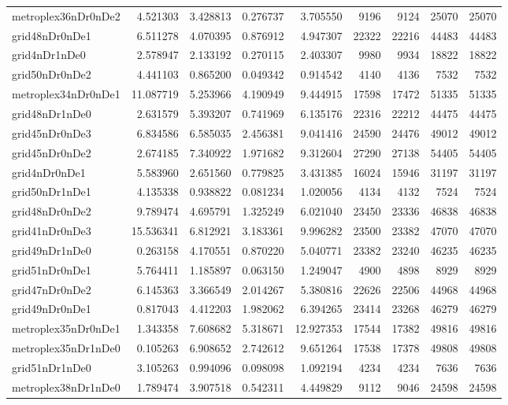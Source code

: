 \begin{longtable}{|l|r|r|r|r|r|r|r|r|}
metroplex36nDr0nDe2 & 4.521303 & 3.428813 & 0.276737 & 3.705550 & 9196 & 9124 & 25070 & 25070 \\
grid48nDr0nDe1 & 6.511278 & 4.070395 & 0.876912 & 4.947307 & 22322 & 22216 & 44483 & 44483 \\
grid4nDr1nDe0 & 2.578947 & 2.133192 & 0.270115 & 2.403307 & 9980 & 9934 & 18822 & 18822 \\
grid50nDr0nDe2 & 4.441103 & 0.865200 & 0.049342 & 0.914542 & 4140 & 4136 & 7532 & 7532 \\
metroplex34nDr0nDe1 & 11.087719 & 5.253966 & 4.190949 & 9.444915 & 17598 & 17472 & 51335 & 51335 \\
grid48nDr1nDe0 & 2.631579 & 5.393207 & 0.741969 & 6.135176 & 22316 & 22212 & 44475 & 44475 \\
grid45nDr0nDe3 & 6.834586 & 6.585035 & 2.456381 & 9.041416 & 24590 & 24476 & 49012 & 49012 \\
grid45nDr0nDe2 & 2.674185 & 7.340922 & 1.971682 & 9.312604 & 27290 & 27138 & 54405 & 54405 \\
grid4nDr0nDe1 & 5.583960 & 2.651560 & 0.779825 & 3.431385 & 16024 & 15946 & 31197 & 31197 \\
grid50nDr1nDe1 & 4.135338 & 0.938822 & 0.081234 & 1.020056 & 4134 & 4132 & 7524 & 7524 \\
grid48nDr0nDe2 & 9.789474 & 4.695791 & 1.325249 & 6.021040 & 23450 & 23336 & 46838 & 46838 \\
grid41nDr0nDe3 & 15.536341 & 6.812921 & 3.183361 & 9.996282 & 23500 & 23382 & 47070 & 47070 \\
grid49nDr1nDe0 & 0.263158 & 4.170551 & 0.870220 & 5.040771 & 23382 & 23240 & 46235 & 46235 \\
grid51nDr0nDe1 & 5.764411 & 1.185897 & 0.063150 & 1.249047 & 4900 & 4898 & 8929 & 8929 \\
grid47nDr0nDe2 & 6.145363 & 3.366549 & 2.014267 & 5.380816 & 22626 & 22506 & 44968 & 44968 \\
grid49nDr0nDe1 & 0.817043 & 4.412203 & 1.982062 & 6.394265 & 23414 & 23268 & 46279 & 46279 \\
metroplex35nDr0nDe1 & 1.343358 & 7.608682 & 5.318671 & 12.927353 & 17544 & 17382 & 49816 & 49816 \\
metroplex35nDr1nDe0 & 0.105263 & 6.908652 & 2.742612 & 9.651264 & 17538 & 17378 & 49808 & 49808 \\
grid51nDr1nDe0 & 3.105263 & 0.994096 & 0.098098 & 1.092194 & 4234 & 4234 & 7636 & 7636 \\
metroplex38nDr1nDe0 & 1.789474 & 3.907518 & 0.542311 & 4.449829 & 9112 & 9046 & 24598 & 24598 \\

\end{longtable}
